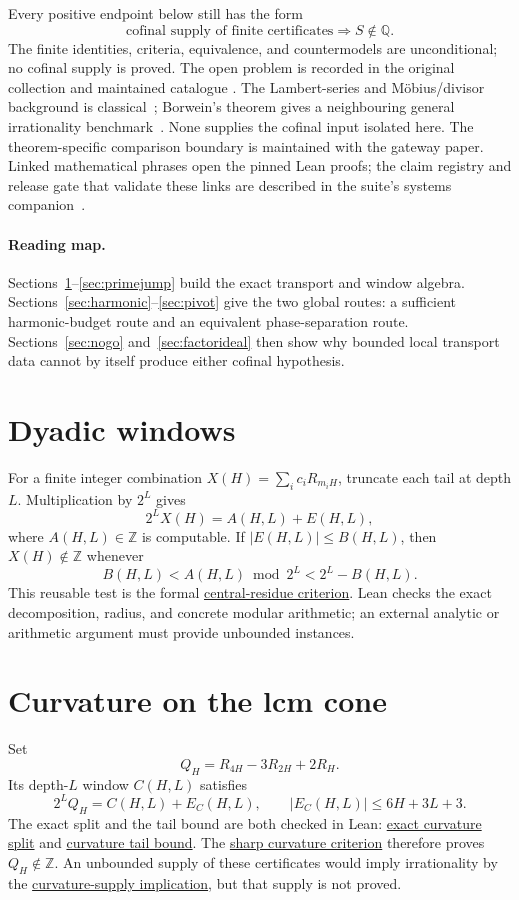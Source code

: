 \documentclass[11pt]{article}
\newcommand{\commit}{c24e2c2a781aa4a104d10884bacae52ef35cff30}
\newcommand{\repobase}{https://github.com/wcook04/plectis-lean-erdos249-257/blob/\commit}
\newcommand{\PK}{Erdos249257}
\newcommand{\lword}[4]{\href{\repobase/\PK/#1\#L#2}{#4}}
\theoremstyle{remark}\newtheorem*{remark}{Remark}
\newcommand{\Z}{\mathbb Z}
\begin{document}
Every positive endpoint below still has the form
\[
 \text{cofinal supply of finite certificates}\Longrightarrow S\notin\mathbb Q.
\]
The finite identities, criteria, equivalence, and countermodels are
unconditional; no cofinal supply is proved.  The open problem is recorded in
the original collection and maintained catalogue
\cite{erdosgraham1980,erdos1988,erdosproblems}.  The Lambert-series and
M\"obius/divisor background is classical~\cite{erdos1948,apostol};
Borwein's theorem gives a neighbouring general irrationality
benchmark~\cite{borwein1992}.  None supplies the cofinal input isolated
here.  The theorem-specific comparison boundary is maintained with the
gateway paper.  Linked mathematical phrases open the pinned Lean proofs; the
claim registry and release gate that validate these links are described in
the suite's systems companion~\cite{syspaper}.

\paragraph{Reading map.}
Sections~\ref{sec:windows}--\ref{sec:primejump} build the exact transport and
window algebra.  Sections~\ref{sec:harmonic}--\ref{sec:pivot} give the two
global routes: a sufficient harmonic-budget route and an equivalent
phase-separation route.  Sections~\ref{sec:nogo} and~\ref{sec:factorideal}
then show why bounded local transport data cannot by itself produce either
cofinal hypothesis.

\section{Dyadic windows}\label{sec:windows}
For a finite integer combination $X(H)=\sum_i c_iR_{m_iH}$, truncate each
tail at depth $L$.  Multiplication by $2^L$ gives
\[
 2^LX(H)=A(H,L)+E(H,L),
\]
where $A(H,L)\in\Z$ is computable.  If $|E(H,L)|\le B(H,L)$, then
$X(H)\notin\Z$ whenever
\[
 B(H,L)<A(H,L)\bmod2^L<2^L-B(H,L).
\]
This reusable test is the formal
\lword{PrimeJumpWindow.lean}{53}{notMem_int_of_window_remainder_bound}{central-residue criterion}.
Lean checks the exact decomposition, radius, and concrete modular arithmetic;
an external analytic or arithmetic argument must provide unbounded instances.

\section{Curvature on the lcm cone}\label{sec:curvature}
Set
\[
 Q_H=R_{4H}-3R_{2H}+2R_H.
\]
Its depth-$L$ window $C(H,L)$ satisfies
\[
 2^LQ_H=C(H,L)+E_C(H,L),\qquad |E_C(H,L)|\le6H+3L+3.
\]
The exact split and the tail bound are both checked in Lean:
\lword{CurvatureCarry.lean}{119}{two_pow_mul_curvature_eq_window_add_shifted}{exact curvature split}
and
\lword{CurvatureCarry.lean}{137}{abs_curvatureShiftedTail_le}{curvature tail bound}.
The
\lword{CurvatureCarry.lean}{159}{curvature_notMem_int_of_sharpCurvatureCert}{sharp curvature criterion}
therefore proves $Q_H\notin\Z$.  An unbounded supply of these certificates
would imply irrationality by the
\lword{CurvatureCarry.lean}{206}{irrational_totientSeries_of_sharpCurvatureSupply}{curvature-supply implication},
but that supply is not proved.
\end{document}
